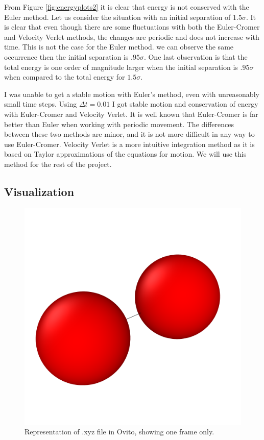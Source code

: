 \documentclass[a4paper,10pt,english]{article}
\begin{document}
From Figure \ref{fig:energyplots2} it is clear that energy is not conserved with the Euler method. Let us consider the situation with an initial separation of $1.5\sigma$. It is clear that even though there are some fluctuations with both the Euler-Cromer and Velocity Verlet methods, the changes are periodic and does not increase with time. This is not the case for the Euler method. we can observe the same occurrence then the initial separation is $.95\sigma$. One last observation is that the total energy is one order of magnitude larger when the initial separation is $.95\sigma$ when compared to the total energy for $1.5\sigma$.

I was unable to get a stable motion with Euler's method, even with unreasonably small time steps. Using $\Delta t = 0.01$ I got stable motion and conservation of energy with Euler-Cromer and Velocity Verlet. It is well known that Euler-Cromer is far better than Euler when working with periodic movement. The differences between these two methods are minor, and it is not more difficult in any way to use Euler-Cromer. Velocity Verlet is a more intuitive integration method as it is based on Taylor approximations of the equations for motion. We will use this method for the rest of the project.

\newpage

\subsection{Visualization} \label{2d}

\begin{figure} [h!]
    \centering
    \includegraphics[scale=0.25]{../figures/2_d_ii_1.png}
    \caption{Representation of .xyz file in Ovito, showing one frame only.}
    \label{fig:ovito1}
\end{figure}
\end{document}
